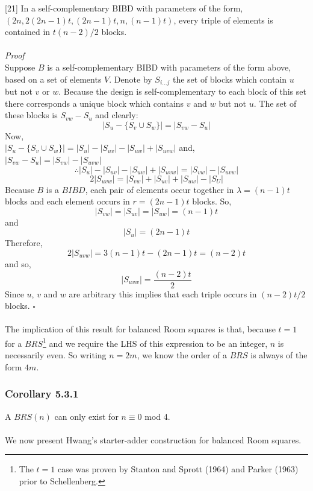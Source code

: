 \documentclass[
  12pt,
  a4paper]{book}
\begin{document}
{[}21{]} In a self-complementary BIBD with parameters of the form,\\
\((2n,2(2n-1)t,(2n-1)t,n,(n-1)t)\), every triple of elements is
contained in \(t(n-2)/2\) blocks.\\
~\\
\emph{Proof}\\
Suppose \(B\) is a self-complementary BIBD with parameters of the form
above, based on a set of elements \(V\). Denote by \(S_{i...j}\) the set
of blocks which contain \(u\) but not \(v\) or \(w\). Because the design
is self-complementary to each block of this set there corresponds a
unique block which contains \(v\) and \(w\) but not \(u\). The set of
these blocks is \(S_{vw}-S_u\) and clearly:
\[|S_u - \{S_v \cup S_w\}| = |S_{vw} - S_u|\] Now,\\
\(|S_u-\{S_v \cup S_w\}| = |S_u| - |S_{uv}| -|S_{uw}| + |S_{uvw}|\)
and,\\
\(|S_{vw} - S_u| = |S_{vw}| - |S_{uvw}|\)
\[\therefore |S_u| - |S_{uv}| -|S_{uw}| + |S_{uvw}| = |S_{vw}| - |S_{uvw}|\]
\[2|S_{uvw}| = |S_{vw}| + |S_{uv}| + |S_{uw}| - |S_{U}|\] Because \(B\)
is a \(BIBD\), each pair of elements occur together in
\(\lambda = (n-1)t\) blocks and each element occurs in \(r=(2n-1)t\)
blocks. So, \[|S_{vw}| = |S_{uv}| = |S_{uw}| = (n-1)t\] and
\[|S_u| = (2n-1)t\] Therefore, \[2|S_{uvw}|=3(n-1)t-(2n-1)t=(n-2)t\] and
so, \[|S_{uvw}| = \frac{(n-2)t}{2}\] Since \(u\), \(v\) and \(w\) are
arbitrary this implies that each triple occurs in \((n-2)t/2\) blocks.
\(\square\)\\
~\\
The implication of this result for balanced Room squares is that,
because \(t=1\) for a \(BRS\)\footnote{The \(t=1\) case was proven by
  Stanton and Sprott (1964) and Parker (1963) prior to Schellenberg.}
and we require the LHS of this expression to be an integer, \(n\) is
necessarily even. So writing \(n=2m\), we know the order of a \(BRS\) is
always of the form \(4m\).

\hypertarget{corollary-5.3.1}{%
\subsubsection{Corollary 5.3.1}\label{corollary-5.3.1}}

A \(BRS(n)\) can only exist for \(n \equiv 0\) mod 4.\\
~\\
We now present Hwang's starter-adder construction for balanced Room
squares.
\end{document}
